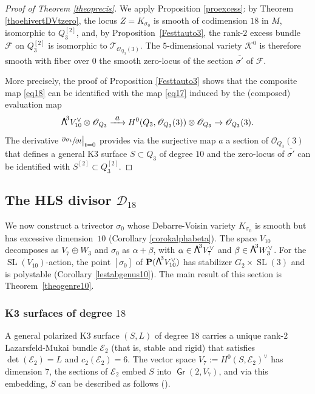 \documentclass[JEP,XML,SOM,Unicode, NoEqCountersInSection,NoFloatCountersInSection]{cedram}
\let\mathcal\mathscr
\newcommand\To[1]{\mathchoice{\xrightarrow{\textstyle\kern4pt#1\kern3pt}}{\stackrel{#1}{\longrightarrow}}{}{}}
\theoremstyle{definition}
\renewcommand\P{{\mathbf P}}\let\PP\P
\newcommand\cD{\mathcal{D}}
\newcommand\cE{\mathcal{E}}
\newcommand\cF{\mathcal{F}}
\newcommand\cK{\mathcal{K}}
\newcommand\cO{\mathcal{O}}\let\OO\cO
\newcommand\cT{\mathcal{T}}
\DeclareMathOperator{\Gr}{\mathsf{Gr}}
\DeclareMathOperator{\SL}{SL}
\newcommand\bw[1]{{\hbox{\large$\mathsf{\Lambda}$}^{\!#1}}}
\newcommand\Qtrois{{Q_3}}
\newcommand\hilb{{Q_3^{[2]}}}
\newcommand\hilbS{S^{[2]}}
\begin{document}
\begin{proof}[Proof of Theorem \ref{theoprecis}]
We apply Proposition \ref{proexcess}:
by Theorem \ref{thoehivertDVtzero},
the locus \hbox{$Z=K_{\sigma_0}$} is smooth of codimension $18$ in $M$, isomorphic to
$\hilb$, and, by Proposition~\ref{Festtauto3}, the rank-$2$ excess
bundle~$\cF $ on $\hilb$ is isomorphic to
$\cT_{\cO_{Q_3}(3)}$. The $5$-dimensional variety $\cK^0$ is therefore smooth
with fiber over $0$ the smooth zero-locus of the
section $\overline {\sigma'} $ of $\cF$.

More precisely, the proof of
Proposition \ref{Festtauto3} shows that the composite
map \eqref{eq18} can be
identified with the map \eqref{eq17}
induced by
the (composed) evaluation map
\[
\bw3V_{10}^\vee\otimes \cO_{\Qtrois}\To{a} H^0(\Qtrois,\cO_{Q_3}(3))\otimes \cO_{\Qtrois}\to \cO_{\Qtrois}(3).
\]
The derivative $\sfrac{\partial\sigma_t}{\partial t}\big\vert_{t=0} $ provides via the surjective map $a$ a section
of $ \cO_{\Qtrois}(3) $ that defines a general K3 surface $S\subset \Qtrois$ of degree $10$ and the zero-locus of $\overline {\sigma'} $ can be identified with $\hilbS\subset Q_3^{[2]}$.
\end{proof}

\subsection{The HLS divisor $\cD_{18}$}\label{secpf10}
We now construct a trivector $\sigma_0$ whose
Debarre-Voisin variety $K_{\sigma_0}$ is smooth but has excessive dimension~$10$ (Corollary \ref{corokalphabeta}). The space $V_{10}$ decomposes as $V_7\oplus W_3$ and
$\sigma_0$ as $\alpha+\beta$, with $\alpha\in \bw3V_7^\vee$ and $\beta\in \bw3W_3^\vee$. For the $\SL(V_{10})$-action, the point $[\sigma_0]$ of $\P(\bw3V_{10}^\vee)$ has stabilizer
$G_2 {\times} \SL(3)$ and is polystable (Corollary \ref{lestabgenus10}). The main result of this section is Theorem~\ref{theogenre10}.

\subsubsection{K3 surfaces of degree $18$}\label{secgenre10}
A general polarized K3 surface $(S,L)$ of degree $18$ carries a unique rank-$2$ Lazarsfeld-Mukai
bundle $\cE_2$ (that is, stable and rigid) that satisfies $\det(\cE_2)=L$ and $c_2(\cE_2)=6$. The vector space
$V_7:=H^0(S,\cE_2 )^\vee$ has dimension $7$, the sections of $\cE_2 $ embed $S$ into $\Gr(2,V_7)$, and
via this embedding, $S$
can be described as follows (\cite{mukai}).
\end{document}
